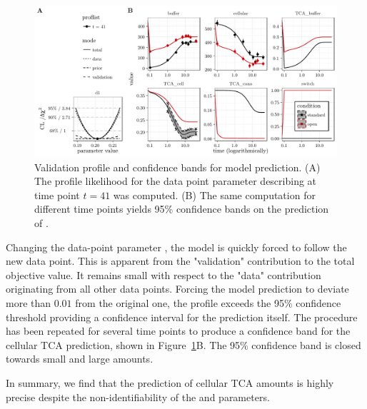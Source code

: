 \documentclass[article]{jss}
\begin{document}
\begin{figure}[ht]
	\centering
	\includegraphics[width = \textwidth]{images/figure9}
	\caption{Validation profile and confidence bands for model prediction. (A) The profile likelihood for the data point parameter  describing  at time point $t = 41$ was computed. (B) The same computation for different time points yields 95\% confidence bands on the prediction of .}
	\label{fig:validation}
\end{figure}

Changing the data-point parameter , the model is quickly forced to follow the new data point. This is apparent from the "validation" contribution to the total objective value. It remains small with respect to the "data" contribution originating from all other data points. Forcing the model prediction to deviate more than $0.01$ from the original one, the profile exceeds the 95\% confidence threshold providing a confidence interval for the prediction itself. The procedure has been repeated for several time points to produce a confidence band for the cellular TCA prediction, shown in Figure~\ref{fig:validation}B. The 95\% confidence band is closed towards small and large amounts. 

In summary, we find that the prediction of cellular TCA amounts is highly precise despite the non-identifiability of the  and  parameters.


{}
\end{document}
